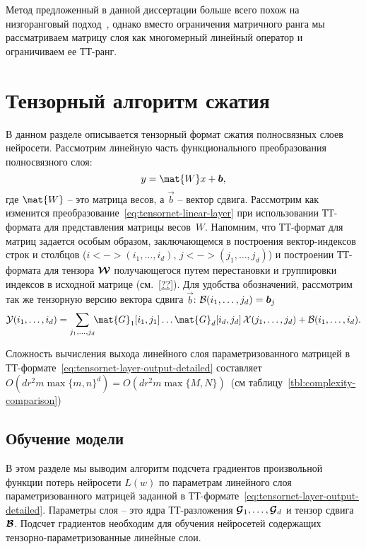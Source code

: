Метод предложенный в данной диссертации больше всего похож на низгоранговый подход~\cite{Denil2013predicting}, однако вместо ограничения матричного ранга мы рассматриваем матрицу слоя как многомерный линейный оператор и ограничиваем ее ТТ-ранг.



\section{Тензорный алгоритм сжатия} \label{sec:tensornet-tt-cnn}
В данном разделе описывается тензорный формат сжатия полносвязных слоев нейросети. Рассмотрим линейную часть функционального преобразования полносвязного слоя:
\begin{equation}
  \label{eq:tensornet-linear-layer}
  y = \mat{W} x + \vec{b},
\end{equation}
где $\mat{W}$ -- это матрица весов, а $\vec{b}$ -- вектор сдвига.
Рассмотрим как изменится преобразование~\ref{eq:tensornet-linear-layer} при использовании ТТ-формата для представления матрицы весов~$W$. Напомним, что ТТ-формат для матриц задается особым образом, заключающемся в построения вектор-индексов строк и столбцов ($i <-> (i_1, \ldots, i_d)$, $j <-> (j_1, \ldots, j_d)$) и построении ТТ-формата для тензора $\boldsymbol{\mathcal{W}}$ получающегося путем перестановки и группировки индексов в исходной матрице (см.~\ref{??}).
Для удобства обозначений, рассмотрим так же тензорную версию вектора сдвига $\vec{b}$: $\mathcal{B}(i_1, \ldots, j_d) = \boldsymbol{b}_j$
\begin{equation}
\label{eq:tensornet-layer-output-detailed}
\tensel{Y}(i_1, \ldots, i_d) =
\sum_{j_1, \ldots, j_d}  \!\!\mat{G}_1[i_1, j_1] \dots \mat{G}_d[i_d, j_d]\, \tensel{X}(j_1,\ldots,j_d) + \tensel{B}(i_1,\ldots,i_d).
\end{equation}

Сложность вычисления выхода линейного слоя параметризованного матрицей в ТТ-формате~\eqref{eq:tensornet-layer-output-detailed} составляет $O(d r^2 m \max\{m, n\}^d) = O(d r^2 m \max\{M, N\})$~(см таблицу~\ref{tbl:complexity-comparison})



\subsection{Обучение модели}
В этом разделе мы выводим алгоритм подсчета градиентов произвольной функции потерь нейросети $L(w)$ по параметрам линейного слоя параметризованного матрицей заданной в ТТ-формате~\eqref{eq:tensornet-layer-output-detailed}. Параметры слоя -- это ядра ТТ-разложения $\boldsymbol{\mathcal{G}}_1, \ldots, \boldsymbol{\mathcal{G}}_d$ и тензор сдвига $\boldsymbol{\mathcal{B}}$. Подсчет градиентов необходим для обучения нейросетей содержащих тензорно-параметризованные линейные слои.


